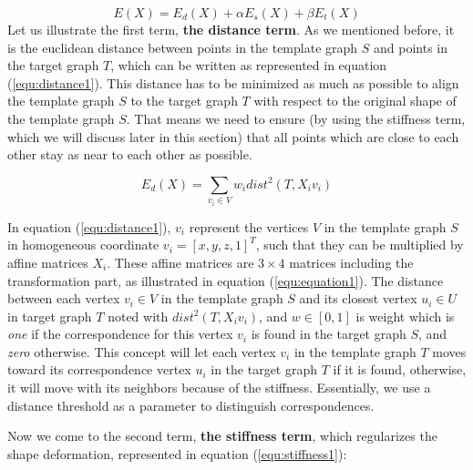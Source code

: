 \documentclass[../structure.tex]{subfiles}
\begin{document}
\begin{equation}
E(X) = E_{d}(X) + \alpha E_{s}(X) + \beta E_{t}(X)
\label{equ:costFun}
\end{equation}
Let us illustrate the first term, \textbf{the distance term}. As we mentioned before, it is the euclidean distance between points in the template graph $S$ and points in the target graph $T$, which can be written as represented in equation (\ref{equ:distance1}). This distance has to be minimized as much as possible to align the template graph $S$ to the target graph $T$ with respect to the original shape of the template graph $S$. That means we need to ensure (by using the stiffness term, which we will discuss later in this section) that all points which are close to each other stay as near to each other as possible.

\begin{equation}
E_{d}(X) = \sum_{v_{i} \in V} w_{i}dist^2(T,X_{i}v_{i})
\label{equ:distance1}
\end{equation}

In equation (\ref{equ:distance1}), $v_{i}$ represent the vertices $V$ in the template graph $S$ in homogeneous coordinate $v_{i} = [x,y,z,1]^T$,  such that they can be multiplied by  affine matrices $X_{i}$. These affine matrices are $3 \times 4$ matrices including the transformation part, as illustrated in equation (\ref{equ:equation1}). The distance between each vertex $v_{i} \in V$ in the template graph $S$ and its closest vertex $u_{i} \in U$ in target graph $T$ noted with $dist^2(T,X_{i}v_{i})$, and $w \in [0,1]$ is weight which is \textit{one} if the correspondence for this vertex $v_{i}$ is found in the target graph $S$, and \textit{zero} otherwise. This concept will let each vertex $v_{i}$ in the template graph $T$ moves toward its correspondence vertex $u_{i}$ in the target graph $T$ if it is found, otherwise, it will move with its neighbors because of the stiffness. Essentially, we use a distance threshold as a parameter to distinguish correspondences.

Now we come to the second term, \textbf{the stiffness term}, which regularizes the shape deformation, represented in equation (\ref{equ:stiffness1}):
\end{document}
